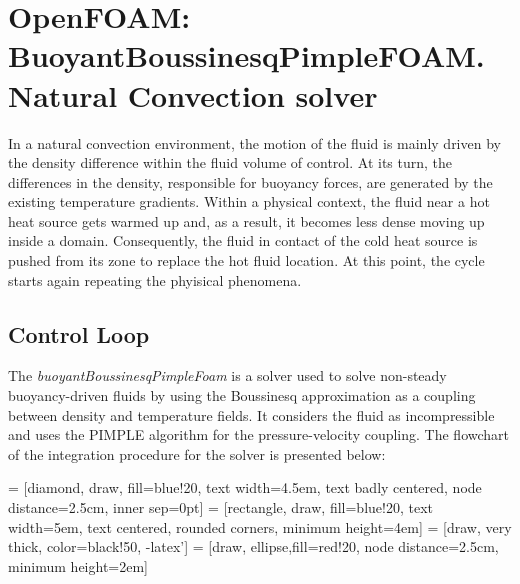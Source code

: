 \newpage
\section{OpenFOAM: BuoyantBoussinesqPimpleFOAM. Natural Convection solver}

In a natural convection environment, the motion of the fluid is mainly driven by the density difference within the fluid volume of control. At its turn, the differences in the density, responsible for buoyancy forces, are generated by the existing temperature gradients. Within a physical context, the fluid near a hot heat source gets warmed up and, as a result, it becomes less dense moving up inside a domain. Consequently, the fluid in contact of the cold heat source is pushed from its zone to replace the hot fluid location. At this point, the cycle starts again repeating the phyisical phenomena.
\subsection{Control Loop}
The \textit{buoyantBoussinesqPimpleFoam} is a solver used to solve non-steady buoyancy-driven fluids by using the Boussinesq approximation as a coupling between density and temperature fields. It considers the fluid as incompressible and uses the PIMPLE algorithm for the pressure-velocity coupling. The flowchart of the integration procedure for the solver is presented below:

 = [diamond, draw, fill=blue!20,
text width=4.5em, text badly centered, node distance=2.5cm, inner sep=0pt]
 = [rectangle, draw, fill=blue!20,
text width=5em, text centered, rounded corners, minimum height=4em]
 = [draw, very thick, color=black!50, -latex']
 = [draw, ellipse,fill=red!20, node distance=2.5cm,
minimum height=2em]

